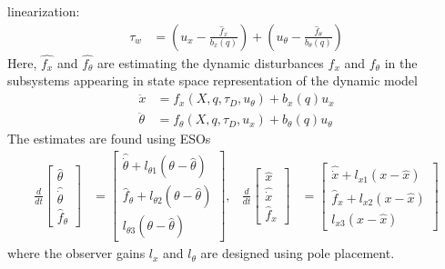 \documentclass[letterpaper, 10 pt, conference]{ieeeconf}
\begin{document}
linearization:
\begin{align}
    \tau_w &= \left( u_x - \frac{\hat{f}_x}{b_x(q)} \right) + \left( u_\theta -
    \frac{\hat{f}_\theta}{b_\theta(q)} \right)
\end{align}
Here, $\hat{f_x}$ and $\hat{f_{\theta}}$ are estimating the dynamic disturbances
$f_x$ and $f_{\theta}$ in the subsystems appearing in state space representation
of the dynamic model
\begin{align}
    \ddot{x} &= f_x(X, q, \tau_D, u_\theta) + b_x(q)u_x \nonumber \\
    \ddot{\theta} &= f_\theta(X, q, \tau_D, u_x) + b_\theta(q)u_\theta
\end{align}
The estimates are found using \aclp{ESO}
\small{
\begin{align}
    \frac{d}{dt} \!\! \begin{bmatrix} \hat\theta \\ \hat{\dot{\theta}} \\
    \hat{f}_\theta \end{bmatrix} &\!\!= \!\! \begin{bmatrix} \hat{\dot{\theta}}
    + l_{\theta 1}(\theta-\hat\theta) \\ \hat{f}_\theta + l_{\theta 2}(\theta -
    \hat\theta) \\ l_{\theta 3} (\theta - \hat\theta) \end{bmatrix}\!\!,
    &\!\!\!\!\!
    \frac{d}{dt} \!\! \begin{bmatrix} \hat{x} \\ \hat{\dot{x}} \\ \hat{f}_x
    \end{bmatrix} &\!\!=\!\! \begin{bmatrix} \hat{\dot{x}} + l_{x1}(x-\hat{x})
    \\ \hat{f}_x + l_{x2}(x - \hat{x}) \\ l_{x3} (x - \hat{x}) \end{bmatrix}
\end{align}}
\normalsize
where the observer gains $l_x$ and $l_{\theta}$ are designed using pole
placement.


\end{document}

